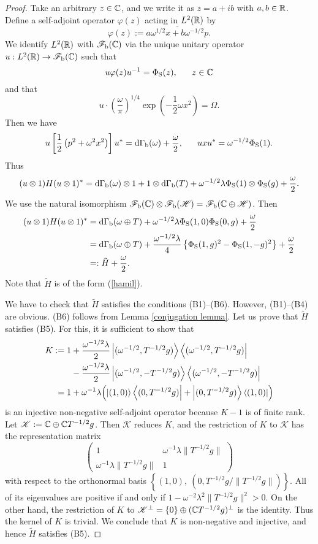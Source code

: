 \documentclass[12pt]{article}
\theoremstyle{plain}
\numberwithin{equation}{section}
\theoremstyle{remark}
\begin{document}
\begin{proof}
Take an arbitrary $z\in\mathbb{C}$, and we write it as $z=a+ib$ with $a,b\in\mathbb{R}$. 
Define a self-adjoint operator $\varphi(z)$ acting in $L^2(\mathbb{R})$ by
\[
\varphi(z):=\overline{a\omega^{1/2}x
+b\omega^{-1/2}p}.
\]
We identify $L^2(\mathbb{R})$ with $\mathscr{F}_\mathrm{b}(\mathbb{C})$ via the 
unique unitary operator $u:L^2(\mathbb{R})\to\mathscr{F}_\mathrm{b}(\mathbb{C})$ 
such that
\[
u\varphi(z)u^{-1}=\Phi_{\rm S}(z), \ \ \ \ \ z\in\CC
\]
and that 
\[
u\cdot\left(\frac{\omega}{\pi}\right)^{1/4}
\exp{\left(-\frac{1}{2}\omega x^2\right)}=\Omega.
\]
Then we have
\[
u\left[\frac{1}{2}\left(p^2  +\omega^2x^2\right)\right]u^*  
= \mathrm{d\Gamma_b}(\omega)+\frac{\omega}{2},
\ \ \ \ \ uxu^*=\omega^{-1/2}\Phi_{\rm S}(1).
\]
Thus
\[
(u\otimes1)H(u\otimes1)^*=\mathrm{d\Gamma_b}(\omega)\otimes1+1\otimes\mathrm{d\Gamma_b}(T)
+\omega^{-1/2}\lambda\Phi_{\rm S}(1)
\otimes\Phi_{\rm S}(g)+\frac{\omega}{2}.
\]
We use the natural isomorphism
$\mathscr{F}_\mathrm{b}(\mathbb{C})\otimes\mathscr{F}_\mathrm{b}(\mathscr{H})=\mathscr{F}_\mathrm{b}(\mathbb{C}\oplus\mathscr{H})$.
Then
\begin{align*}
(u\otimes1)H(u\otimes1)^*&=\mathrm{d\Gamma_b}(\omega\oplus T) +\omega^{-1/2}\lambda\Phi_{\rm S}(1,0)\Phi_{\rm S}(0,g)+\frac{\omega}{2}\\
&=\mathrm{d\Gamma_b}(\omega\oplus T) +\frac{\omega^{-1/2}\lambda}{4}\left\{\Phi_{\rm S}(1,g)^2-\Phi_{\rm S}(1,-g)^2\right\}+\frac{\omega}{2}\\
&=:\tilde{H}+\frac{\omega}{2}.
\end{align*}
Note that $\tilde{H}$ is of the form (\ref{hamil}).

We have to check that $\tilde{H}$ satisfies the conditions (B1)--(B6).
However, (B1)--(B4) are obvious.
(B6) follows from Lemma \ref{conjugation lemma}.
Let us prove that $\tilde{H}$ satisfies (B5).
For this, it is sufficient to show that
\begin{align*}
K:=1&+\frac{\omega^{-1/2}\lambda}{2} 
\left|(\omega^{-1/2},T^{-1/2}g)\right\rangle\left\langle (\omega^{-1/2},T^{-1/2}g)\right|\\
&- \frac{\omega^{-1/2}\lambda}{2} \left|(\omega^{-1/2},-T^{-1/2}g)\right\rangle\left\langle (\omega^{-1/2},-T^{-1/2}g)\right|\\
=1&+\omega^{-1}\lambda
\Bigl(\left|(1,0)\right\rangle\left\langle (0,T^{-1/2}g)\right|
+\left|(0,T^{-1/2}g)\right\rangle\left\langle (1,0)\right|\Bigr)
\end{align*}
is an injective non-negative self-adjoint operator because $K-1$ is of finite rank.
Let $\mathscr{K}:=\mathbb{C}\oplus\mathbb{C} T^{-1/2}g$.
Then $\mathscr{K}$ reduces $K$, and the restriction of $K$ to $\mathscr{K}$ has the representation matrix
\[
\begin{pmatrix}
1 & \omega^{-1}\lambda\|T^{-1/2}g\| \\
\omega^{-1}\lambda\|T^{-1/2}g\| & 1
\end{pmatrix}
\]
with respect to the orthonormal basis $\left\{(1,0),\ (0,T^{-1/2}g/\|T^{-1/2}g\|)\right\}$.
All of its eigenvalues are positive if and only if $1-\omega^{-2}\lambda^2\|T^{-1/2}g\|^2>0$.
On the other hand, the restriction of $K$ to $\mathscr{K}^{\perp}=\{0\}\oplus(\mathbb{C} T^{-1/2}g)^{\perp}$ is the identity.
Thus the kernel of $K$ is trivial.
We conclude that $K$ is non-negative and injective, and hence $\tilde{H}$ satisfies (B5).


\end{proof}
\end{document}
